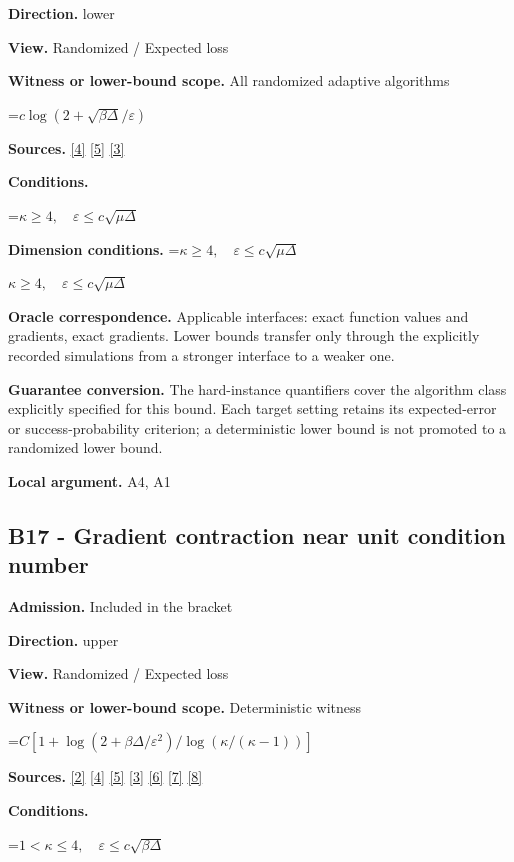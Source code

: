 \documentclass[10pt,a4paper]{article}
\newcommand{\AtlasMath}[1]{\par\begingroup\centering\setbox0=\hbox{$\displaystyle #1$}\ifdim\wd0>1.4\linewidth\typeout{ATLAS WIDE FORMULA: \the\wd0}\fi\ifdim\wd0>\linewidth\resizebox{\linewidth}{!}{\box0}\else\box0\fi\par\endgroup}
\newcommand{\AtlasInlineMath}[1]{\begingroup\setbox0=\hbox{$#1$}\ifdim\wd0>.4\linewidth\endgroup\AtlasMath{#1}\else\endgroup$#1$\fi}
\begin{document}
\textbf{Direction.} lower

\textbf{View.} Randomized / Expected loss

\textbf{Witness or lower-bound scope.} All randomized adaptive algorithms

\AtlasMath{c\log(2+\sqrt{\beta\Delta}/\varepsilon)}
\textbf{Sources.} \href{https://arxiv.org/pdf/2101.09740v2}{[4]} \href{https://arxiv.org/pdf/2609.33360v2}{[5]} \href{https://arxiv.org/pdf/2609.10874}{[3]}

\textbf{Conditions.} 
\AtlasMath{\kappa\ge4,\quad\varepsilon\le c\sqrt{\mu\Delta}}


\textbf{Dimension conditions.} \AtlasInlineMath{\kappa\ge4,\quad\varepsilon\le c\sqrt{\mu\Delta}}

\textbf{Oracle correspondence.} Applicable interfaces: exact function values and gradients, exact gradients. Lower bounds transfer only through the explicitly recorded simulations from a stronger interface to a weaker one.

\textbf{Guarantee conversion.} The hard-instance quantifiers cover the algorithm class explicitly specified for this bound. Each target setting retains its expected-error or success-probability criterion; a deterministic lower bound is not promoted to a randomized lower bound.

\textbf{Local argument.} A4, A1

\subsection{B17 - Gradient contraction near unit condition number}
\textbf{Admission.} Included in the bracket

\textbf{Direction.} upper

\textbf{View.} Randomized / Expected loss

\textbf{Witness or lower-bound scope.} Deterministic witness

\AtlasMath{C[1+\log(2+\beta\Delta/\varepsilon^2)/\log(\kappa/(\kappa-1))]}
\textbf{Sources.} \href{https://doi.org/10.1007/s10107-026-02352-2}{[2]} \href{https://arxiv.org/pdf/2101.09740v2}{[4]} \href{https://arxiv.org/pdf/2609.33360v2}{[5]} \href{https://arxiv.org/pdf/2609.10874}{[3]} \href{https://arxiv.org/pdf/1405.4980}{[6]} \href{https://www2.isye.gatech.edu/~nemirovs/MOR_AccuracyCertificates.pdf}{[7]} \href{https://arxiv.org/pdf/2609.20701}{[8]}

\textbf{Conditions.} 
\AtlasMath{1<\kappa\le4,\quad\varepsilon\le c\sqrt{\beta\Delta}}
\end{document}
